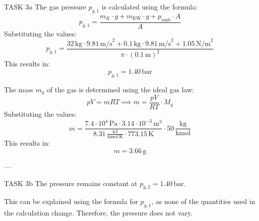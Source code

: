 TASK 3a  
The gas pressure \( p_{g,1} \) is calculated using the formula:  
\[
p_{g,1} = \frac{m_K \cdot g + m_{\text{EW}} \cdot g + p_{\text{amb}} \cdot A}{A}
\]  
Substituting the values:  
\[
p_{g,1} = \frac{32 \, \text{kg} \cdot 9.81 \, \text{m/s}^2 + 0.1 \, \text{kg} \cdot 9.81 \, \text{m/s}^2 + 1.05 \, \text{N/m}^2}{\pi \cdot (0.1 \, \text{m})^2}
\]  
This results in:  
\[
p_{g,1} = 1.40 \, \text{bar}
\]  

The mass \( m_g \) of the gas is determined using the ideal gas law:  
\[
pV = mRT \implies m = \frac{pV}{RT} \cdot M_g
\]  
Substituting the values:  
\[
m = \frac{7.4 \cdot 10^4 \, \text{Pa} \cdot 3.14 \cdot 10^{-3} \, \text{m}^3}{8.31 \, \frac{\text{kJ}}{\text{kmol·K}} \cdot 773.15 \, \text{K}} \cdot 50 \, \frac{\text{kg}}{\text{kmol}}
\]  
This results in:  
\[
m = 3.66 \, \text{g}
\]  

---

TASK 3b  
The pressure remains constant at \( p_{g,2} = 1.40 \, \text{bar} \).  

This can be explained using the formula for \( p_{g,1} \), as none of the quantities used in the calculation change. Therefore, the pressure does not vary.